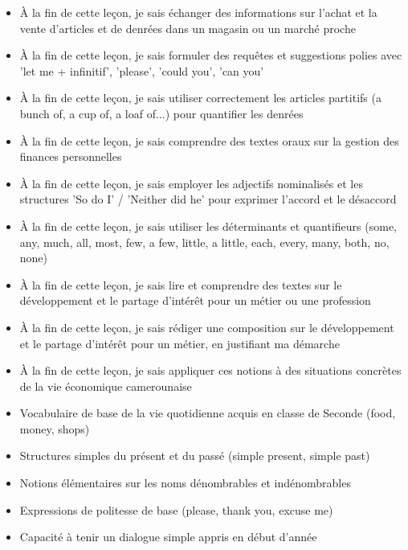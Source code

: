 \documentclass[11pt]{article}
\begin{document}
\begin{objectifs}
\begin{itemize}
\item À la fin de cette leçon, je sais échanger des informations sur l'achat et la vente d'articles et de denrées dans un magasin ou un marché proche
\item À la fin de cette leçon, je sais formuler des requêtes et suggestions polies avec 'let me + infinitif', 'please', 'could you', 'can you'
\item À la fin de cette leçon, je sais utiliser correctement les articles partitifs (a bunch of, a cup of, a loaf of...) pour quantifier les denrées
\item À la fin de cette leçon, je sais comprendre des textes oraux sur la gestion des finances personnelles
\item À la fin de cette leçon, je sais employer les adjectifs nominalisés et les structures 'So do I' / 'Neither did he' pour exprimer l'accord et le désaccord
\item À la fin de cette leçon, je sais utiliser les déterminants et quantifieurs (some, any, much, all, most, few, a few, little, a little, each, every, many, both, no, none)
\item À la fin de cette leçon, je sais lire et comprendre des textes sur le développement et le partage d'intérêt pour un métier ou une profession
\item À la fin de cette leçon, je sais rédiger une composition sur le développement et le partage d'intérêt pour un métier, en justifiant ma démarche
\item À la fin de cette leçon, je sais appliquer ces notions à des situations concrètes de la vie économique camerounaise
\end{itemize}
\end{objectifs}

\begin{prerequis}
\begin{itemize}
\item Vocabulaire de base de la vie quotidienne acquis en classe de Seconde (food, money, shops)
\item Structures simples du présent et du passé (simple present, simple past)
\item Notions élémentaires sur les noms dénombrables et indénombrables
\item Expressions de politesse de base (please, thank you, excuse me)
\item Capacité à tenir un dialogue simple appris en début d'année
\end{itemize}
\end{prerequis}
\end{document}
